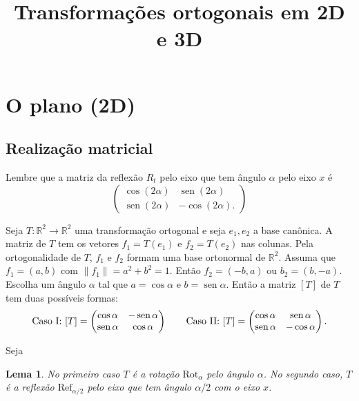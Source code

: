 \documentclass[12pt]{amsart}
\newcommand{\R}{\mathbb R}
\DeclareMathOperator{\sen}{\text{sen}}
\newcommand{\rot}[1]{{\textrm{Rot}}_{#1}}
\newcommand{\refl}[1]{{\textrm{Ref}}_{#1}}
\newtheorem{lemma}[theorem]{Lema}
\theoremstyle{definition}
\begin{document}
\title[Isometrias do espaço]{Transformações ortogonais em 2D e 3D}
\maketitle


\section{O plano (2D)}

\subsection{Realização matricial}
Lembre que a matriz da reflexão $R_t$ pelo eixo que tem ângulo $\alpha$ pelo eixo $x$ é
\[ 
\begin{pmatrix}\cos(2\alpha) & \sen(2\alpha) \\ \sen(2\alpha) & -\cos(2\alpha).
\end{pmatrix}
\]

Seja $T:\R^2\to\R^2$ uma transformação ortogonal e seja $e_1,e_2$ a base canônica. 
A matriz de $T$ tem os vetores $f_1=T(e_1)$ e $f_2=T(e_2)$ nas colunas. Pela ortogonalidade de 
$T$, $f_1$ e $f_2$ formam uma base ortonormal de $\R^2$. Assuma que $f_1=(a,b)$ com $\|f_1\|=a^2+b^2=1$. Então 
$f_2=(-b,a)$ ou $b_2=(b,-a)$.  Escolha um ângulo $\alpha$ tal  que $a=\cos\alpha$ e $b=\sen\alpha$. 
Então a matriz $[T]$ de $T$ tem duas possíveis formas:
\[ 
    \mbox{Caso I:}\ [T]=\begin{pmatrix}\cos \alpha & -\sen \alpha\\\sen\alpha &\cos\alpha\end{pmatrix}\\
    \qquad
    \mbox{Caso II:}\ [T]=\begin{pmatrix}\cos \alpha & \sen \alpha\\\sen\alpha &-\cos\alpha\end{pmatrix}.
\]

Seja 

\begin{lemma}
    No primeiro caso $T$ é a rotação $\rot\alpha$ pelo ângulo $\alpha$. No segundo caso, $T$ é a 
    reflexão $\refl{\alpha/2}$ pelo eixo que 
    tem ângulo $\alpha/2$ com o eixo $x$. 
\end{lemma}
\end{document}
